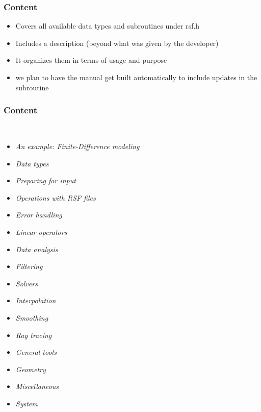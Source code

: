 \begin{frame} \frametitle{Content}

\begin{itemize}
   \item Covers all available data types and subroutines under rsf.h
   \item Includes a description (beyond what was given by the developer)
   \item It organizes them in terms of usage and purpose
   \item we plan to have the manual get built automatically to include updates in the subroutine
\end{itemize}

\end{frame}
\cwpnote{}

\begin{frame} \frametitle{Content}\
\vspace{-0.2in}

\begin{itemize}
\item \emph{An example: Finite-Difference modeling}
\item \emph{Data types}\label{sec:datatypes}
\item \emph{Preparing for input}\label{sec:input}
\item \emph{Operations with RSF files}\label{sec:files}
\item \emph{Error handling}\label{sec:error}
\item \emph{Linear operators}\label{sec:lop}
\item \emph{Data analysis}\label{sec:analysis}
\item \emph{Filtering}\label{sec:filter}
\item \emph{Solvers}\label{sec:solvers}
\item \emph{Interpolation}\label{sec:interpolation}
\item \emph{Smoothing}\label{sec:smoothing}
\item \emph{Ray tracing}\label{sec:ray}
\item \emph{General tools}\label{sec:general}
\item \emph{Geometry}\label{sec:geometry}
\item \emph{Miscellaneous}\label{sec:misc}
\item \emph{System}\label{sec:system}
\end{itemize}
\end{frame}
\cwpnote{}


